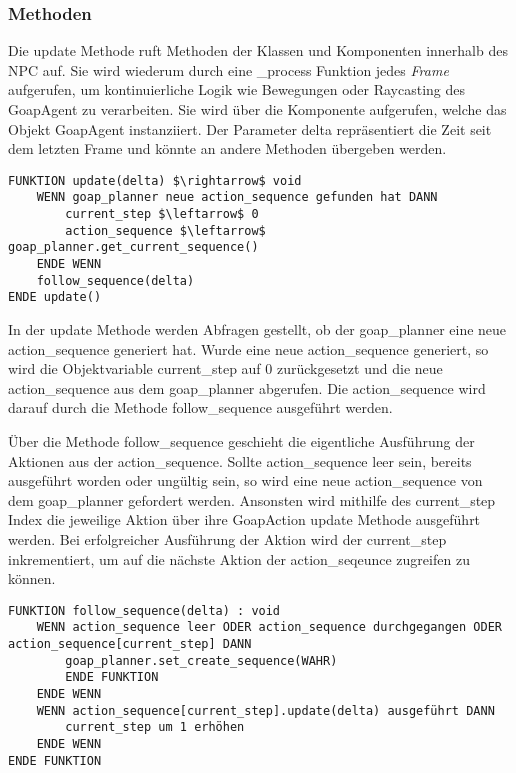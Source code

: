 \subsubsection{Methoden}

Die update Methode ruft Methoden der Klassen und Komponenten innerhalb des NPC auf. Sie wird wiederum durch eine \_process Funktion jedes \textit{Frame} aufgerufen, um kontinuierliche Logik wie Bewegungen oder Raycasting des GoapAgent zu verarbeiten. Sie wird über die Komponente aufgerufen, welche das Objekt GoapAgent instanziiert. Der Parameter delta repräsentiert die Zeit seit dem letzten Frame und könnte an andere Methoden übergeben werden.

%

\begin{lstlisting}[language=Pseudo, caption={update Methode des GoapAgent}, mathescape=true]
FUNKTION update(delta) $\rightarrow$ void
    WENN goap_planner neue action_sequence gefunden hat DANN
        current_step $\leftarrow$ 0
        action_sequence $\leftarrow$ goap_planner.get_current_sequence()
    ENDE WENN
    follow_sequence(delta)
ENDE update()
\end{lstlisting}

In der update Methode werden Abfragen gestellt, ob der goap\_planner eine neue action\_sequence generiert hat. Wurde eine neue action\_sequence generiert, so wird die Objektvariable current\_step auf $0$ zurückgesetzt und die neue action\_sequence aus dem goap\_planner abgerufen. Die action\_sequence wird darauf durch die Methode follow\_sequence ausgeführt werden.

Über die Methode follow\_sequence geschieht die eigentliche Ausführung der Aktionen aus der action\_sequence. Sollte action\_sequence leer sein, bereits ausgeführt worden oder ungültig sein, so wird eine neue action\_sequence von dem goap\_planner gefordert werden. Ansonsten wird mithilfe des current\_step Index die jeweilige Aktion über ihre GoapAction update Methode ausgeführt werden. Bei erfolgreicher Ausführung der Aktion wird der current\_step inkrementiert, um auf die nächste Aktion der action\_seqeunce zugreifen zu können.

\begin{lstlisting}[language=Pseudo, caption={follow\_sequence Methode des GoapAgent}, mathescape=true]
FUNKTION follow_sequence(delta) : void
	WENN action_sequence leer ODER action_sequence durchgegangen ODER action_sequence[current_step] DANN
		goap_planner.set_create_sequence(WAHR)
		ENDE FUNKTION
	ENDE WENN
	WENN action_sequence[current_step].update(delta) ausgeführt DANN
		current_step um 1 erhöhen
	ENDE WENN
ENDE FUNKTION
\end{lstlisting}




